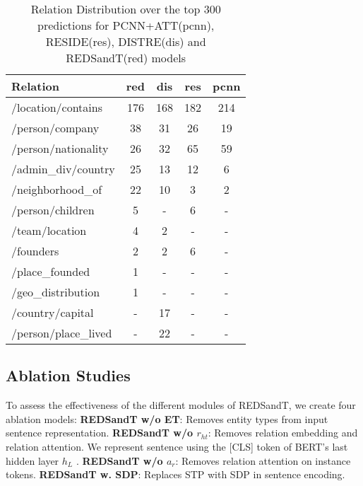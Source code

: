 \documentclass[11pt,a4paper]{article}
\begin{document}
\begin{table}[t]
\begin{tabular}{@{}l*4c@{}} 
\toprule
 Relation  & red & dis & res & pcnn \\
 \midrule
 /location/contains   & 176 & 168 & 182& 214\\
 /person/company      & 38  & 31  & 26 & 19\\
 /person/nationality  & 26  & 32  & 65 & 59\\
 /admin\_div/country  & 25  & 13  & 12 & 6\\
 /neighborhood\_of    & 22  & 10  & 3  & 2\\
 /person/children     & 5   &  -  & 6  & -\\
 /team/location       & 4   & 2   &  - & -\\
 /founders            & 2   &  2  & 6  & -\\
 /place\_founded      & 1   &  -  & -  & -\\
 /geo\_distribution   & 1   &  -  & -  & -\\
 /country/capital     & -   & 17  & -  & -\\
 /person/place\_lived & -   & 22  & -  & -\\
\bottomrule
\end{tabular}
\caption{Relation Distribution over the top 300 predictions for PCNN+ATT(pcnn), RESIDE(res), DISTRE(dis) and REDSandT(red) models}
\label{table:relDistributionTop300}
\vspace{-2mm}
\end{table}

\subsection{Ablation Studies}
\label{sec:ablation_studies}
To assess the effectiveness of the different modules of REDSandT, we create four ablation models:
\newline
\textbf{REDSandT w/o ET}: Removes entity types from input sentence representation.
\newline
\textbf{REDSandT w/o $r_{ht}$}: Removes relation embedding and relation attention. We represent sentence using the [CLS] token of BERT's last hidden layer $h_L$ . 
\newline
\textbf{REDSandT w/o $a_r$}: Removes relation attention on instance tokens.
\newline
\textbf{REDSandT w. SDP}: Replaces STP with SDP \cite{Xu2015} in sentence encoding.
\end{document}
